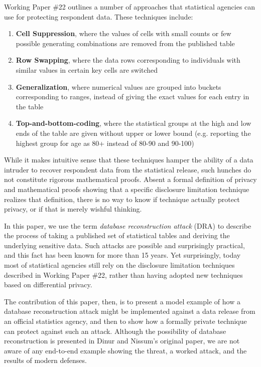 \documentclass[runningheads]{llncs}
\begin{document}
Working Paper \#22 outlines a number of approaches that statistical
agencies can use for protecting respondent data. These techniques include:
\begin{enumerate}
  \item \textbf{Cell Suppression}, where the values of cells with small counts or few possible
        generating combinations are removed from the published table
  \item \textbf{Row Swapping}, where the data rows corresponding to individuals
        with similar values in certain key cells are switched
  \item \textbf{Generalization}, where numerical values are grouped into
        buckets corresponding to ranges, instead of giving the exact
        values for each entry in the table
  \item \textbf{Top-and-bottom-coding}, where the statistical groups at the high and low ends
        of the table are given without upper or lower bound (e.g.
        reporting the highest group for age as 80+ instead of
        80-90 and 90-100)
\end{enumerate}

While it makes intuitive sense that these techniques hamper the
ability of a  data intruder\cite{data-intruder} to recover respondent data from the
statistical release, such hunches do not constitute rigorous
mathematical proofs. Absent a formal definition of privacy and
mathematical proofs showing that a specific disclosure limitation
technique realizes that definition, there is no way to know if
technique actually protect privacy, or if that is merely wishful thinking.

In this paper, we use
the term \emph{database reconstruction attack} (DRA) to describe the process of
taking a published set of statistical tables and deriving the
underlying sensitive data. Such attacks are possible and surprisingly
practical, and this fact has been known for more than 15
years\cite{noise}. Yet surprisingly, today most of
statistical agencies still rely on the disclosure
limitation techniques described in Working Paper \#22, rather than
having adopted new techniques based on differential
privacy\cite{Dwork:2006:CNS:2180286.2180305}.

The contribution of this paper, then, is to present a model example of how
a database reconstruction attack might be implemented against a data
release from an official statistics agency, and then to show how a
formally private technique can protect against such an
attack. Although the possibility of database reconstruction is
presented in Dinur and Nissum's original paper\cite{noise}, we are not
aware of any end-to-end example showing the threat, a worked attack,
and the results of modern defenses.
\end{document}

